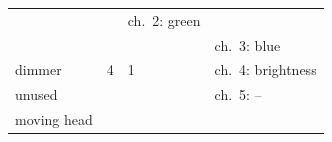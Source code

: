 \begin{longtable}[]{@{}llll@{}}
\begin{minipage}[t]{0.12\columnwidth}
\strut
\end{minipage} & \begin{minipage}[t]{0.15\columnwidth}\raggedright\strut
\strut
\end{minipage} & \begin{minipage}[t]{0.28\columnwidth}\raggedright\strut
ch.~2: green\strut
\end{minipage}\tabularnewline
\begin{minipage}[t]{0.17\columnwidth}\raggedright\strut
\strut
\end{minipage} & \begin{minipage}[t]{0.12\columnwidth}\raggedright\strut
\strut
\end{minipage} & \begin{minipage}[t]{0.15\columnwidth}\raggedright\strut
\strut
\end{minipage} & \begin{minipage}[t]{0.28\columnwidth}\raggedright\strut
ch.~3: blue\strut
\end{minipage}\tabularnewline
\midrule
\begin{minipage}[t]{0.17\columnwidth}\raggedright\strut
dimmer\strut
\end{minipage} & \begin{minipage}[t]{0.12\columnwidth}\raggedright\strut
4\strut
\end{minipage} & \begin{minipage}[t]{0.15\columnwidth}\raggedright\strut
1\strut
\end{minipage} & \begin{minipage}[t]{0.28\columnwidth}\raggedright\strut
ch.~4: brightness\strut
\end{minipage}\tabularnewline
\midrule
\begin{minipage}[t]{0.17\columnwidth}\raggedright\strut
unused\strut
\end{minipage} & \begin{minipage}[t]{0.12\columnwidth}\raggedright\strut
\strut
\end{minipage} & \begin{minipage}[t]{0.15\columnwidth}\raggedright\strut
\strut
\end{minipage} & \begin{minipage}[t]{0.28\columnwidth}\raggedright\strut
ch.~5: --\strut
\end{minipage}\tabularnewline
\midrule
\begin{minipage}[t]{0.17\columnwidth}\raggedright\strut
moving head\strut
\end{minipage} & \begin{minipage}[t]{0.12\columnwidth}\raggedright\strut

\end{minipage}
\end{longtable}
